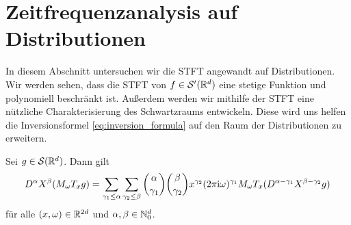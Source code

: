 \section{Zeitfrequenzanalysis auf Distributionen}

In diesem Abschnitt untersuchen wir die STFT angewandt auf Distributionen.
Wir werden sehen, dass die STFT von $ f \in \mathcal{S}^\prime(\mathbb{R}^d) $ eine stetige Funktion und polynomiell beschränkt ist.
Außerdem werden wir mithilfe der STFT eine nützliche Charakterisierung des Schwartzraums entwickeln.
Diese wird uns helfen die Inversionsformel \eqref{eq:inversion_formula} auf den Raum der Distributionen zu erweitern.

\begin{lem}
	Sei $ g \in \mathcal{S}(\mathbb{R}^d) $.
	Dann gilt
	\begin{align}\label{eq:deri_prod_time_freq}
	D^\alpha X^\beta(M_\omega T_x g)
	=
	\sum \limits_{\gamma_1 \leq \alpha}
	\sum \limits_{\gamma_2 \leq \beta}
	\binom{\alpha}{\gamma_1}
	\binom{\beta}{\gamma_2}
	x^{\gamma_2}
	(2 \pi \textrm{i} \omega)^{\gamma_1}
	M_\omega T_x(D^{\alpha- \gamma_1} X^{\beta-\gamma_2} g)
	\end{align}
	für alle $ (x,\omega) \in \mathbb{R}^{2d} $ und $ \alpha, \beta \in \mathbb{N}^d_0 $.
	
\end{lem}

